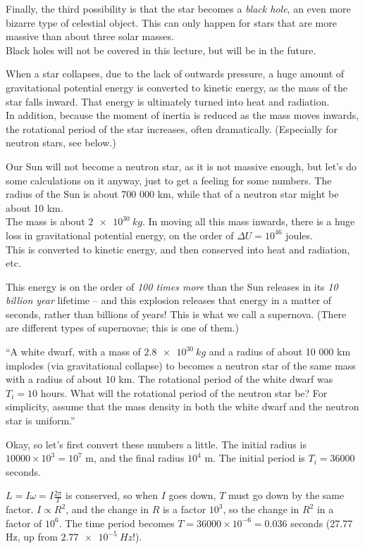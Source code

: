 Finally, the third possibility is that the star becomes a \emph{black hole}, an even more bizarre type of celestial object. This can only happen for stars that are more massive than about three solar masses.\\
Black holes will not be covered in this lecture, but will be in the future.

When a star collapses, due to the lack of outwards pressure, a huge amount of gravitational potential energy is converted to kinetic energy, as the mass of the star falls inward. That energy is ultimately turned into heat and radiation.\\
In addition, because the moment of inertia is reduced as the mass moves inwards, the rotational period of the star increases, often dramatically. (Especially for neutron stars, see below.)

Our Sun will not become a neutron star, as it is not massive enough, but let's do some calculations on it anyway, just to get a feeling for some numbers. The radius of the Sun is about 700 000 km, while that of a neutron star might be about 10 km.\\
The mass is about $\SI{2e30}{kg}$. In moving all this mass inwards, there is a huge loss in gravitational potential energy, on the order of $\Delta U = 10^{46}$ joules.\\
This is converted to kinetic energy, and then conserved into heat and radiation, etc.

This energy is on the order of \emph{100 times more} than the Sun releases in its \emph{10 billion year} lifetime -- and this explosion releases that energy in a matter of seconds, rather than billions of years! This is what we call a supernova. (There are different types of supernovae; this is one of them.)

``A white dwarf, with a mass of $\SI{2.8e30}{kg}$ and a radius of about 10 000 km implodes (via gravitational collapse) to becomes a neutron star of the same mass with a radius of about 10 km. The rotational period of the white dwarf was $T_i = 10$ hours. What will the rotational period of the neutron star be? For simplicity, assume that the mass density in both the white dwarf and the neutron star is uniform.''

Okay, so let's first convert these numbers a little. The initial radius is $10000\times10^3 = 10^7$ m, and the final radius $10^4$ m. The initial period is $T_i = 36000$ seconds.

$\displaystyle L = I \omega = I \frac{2 \pi}{T}$ is conserved, so when $I$ goes down, $T$ must go down by the same factor. $I \propto R^2$, and the change in $R$ is a factor $10^3$, so the change in $R^2$ in a factor of $10^6$. The time period becomes $T = 36000 \times 10^{-6} = 0.036$ seconds (27.77 Hz, up from $\SI{2.77e-5}{Hz}$!).

